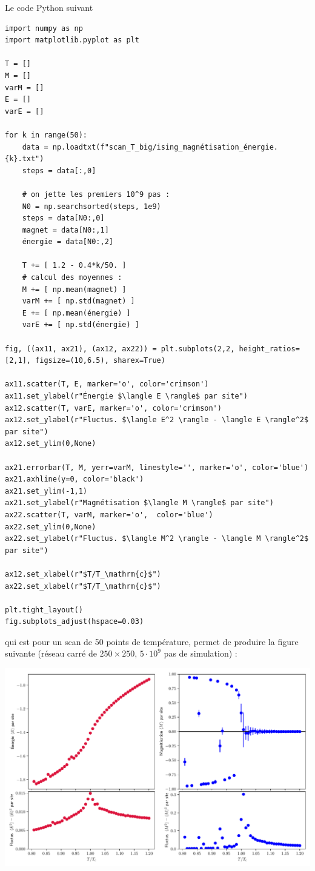 \documentclass{book}
\begin{document}
\begin{correction}
Le code Python suivant
\begin{verbatim}
import numpy as np
import matplotlib.pyplot as plt

T = []
M = []
varM = []
E = []
varE = []

for k in range(50):
    data = np.loadtxt(f"scan_T_big/ising_magnétisation_énergie.{k}.txt")
    steps = data[:,0]

    # on jette les premiers 10^9 pas :
    N0 = np.searchsorted(steps, 1e9)
    steps = data[N0:,0]
    magnet = data[N0:,1]
    énergie = data[N0:,2]

    T += [ 1.2 - 0.4*k/50. ]
    # calcul des moyennes :
    M += [ np.mean(magnet) ]
    varM += [ np.std(magnet) ]
    E += [ np.mean(énergie) ]
    varE += [ np.std(énergie) ]

fig, ((ax11, ax21), (ax12, ax22)) = plt.subplots(2,2, height_ratios=[2,1], figsize=(10,6.5), sharex=True)

ax11.scatter(T, E, marker='o', color='crimson')
ax11.set_ylabel(r"Énergie $\langle E \rangle$ par site")
ax12.scatter(T, varE, marker='o', color='crimson')
ax12.set_ylabel(r"Fluctus. $\langle E^2 \rangle - \langle E \rangle^2$ par site")
ax12.set_ylim(0,None)

ax21.errorbar(T, M, yerr=varM, linestyle='', marker='o', color='blue')
ax21.axhline(y=0, color='black')
ax21.set_ylim(-1,1)
ax21.set_ylabel(r"Magnétisation $\langle M \rangle$ par site")
ax22.scatter(T, varM, marker='o',  color='blue')
ax22.set_ylim(0,None)
ax22.set_ylabel(r"Fluctus. $\langle M^2 \rangle - \langle M \rangle^2$ par site")

ax12.set_xlabel(r"$T/T_\mathrm{c}$")
ax22.set_xlabel(r"$T/T_\mathrm{c}$")

plt.tight_layout()
fig.subplots_adjust(hspace=0.03)
\end{verbatim}
qui est pour un scan de 50 points de température, permet de produire la figure suivante (réseau carré de $250 \times 250$, $5\cdot 10^9$ pas de simulation) :
\begin{center}
\includegraphics[width=1\linewidth]{TD3/ising_stats_scanT_250x250_5e9steps_pasdécoupé.pdf}
\end{center}


\end{correction}
\end{document}
